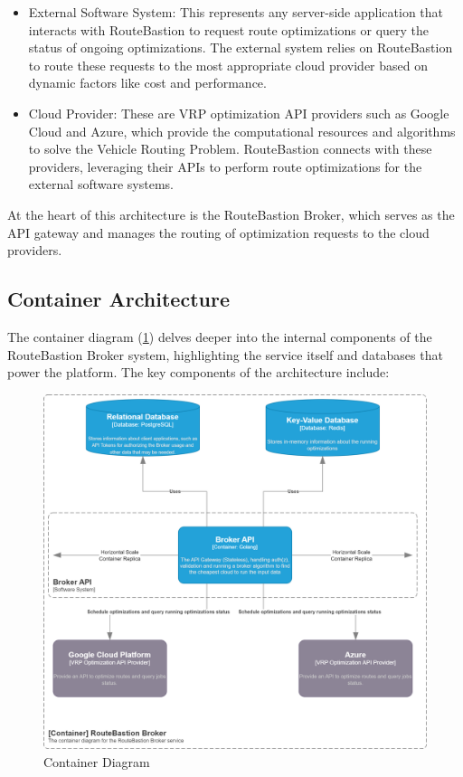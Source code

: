\documentclass[english,notblind]{sbc20}
\begin{document}
\begin{itemize}
  \item External Software System: This represents any server-side application that interacts with RouteBastion to request route optimizations or query the status of ongoing optimizations. The external system relies on RouteBastion to route these requests to the most appropriate cloud provider based on dynamic factors like cost and performance.

  \item Cloud Provider: These are VRP optimization API providers such as Google Cloud and Azure, which provide the computational resources and algorithms to solve the Vehicle Routing Problem. RouteBastion connects with these providers, leveraging their APIs to perform route optimizations for the external software systems.
\end{itemize}

At the heart of this architecture is the RouteBastion Broker, which serves as the API gateway and manages the routing of optimization requests to the cloud providers.

\subsection{Container Architecture}
\label{subsec:container_architecture}
The container diagram (\ref{fig:container}) delves deeper into the internal components of the RouteBastion Broker system, highlighting the service itself and databases that power the platform. The key components of the architecture include:

\begin{figure}
  \includegraphics[width=\columnwidth]{figures/c4_diagrams/Container.png}
  \caption{Container Diagram\label{fig:container}}
\end{figure}
\end{document}
